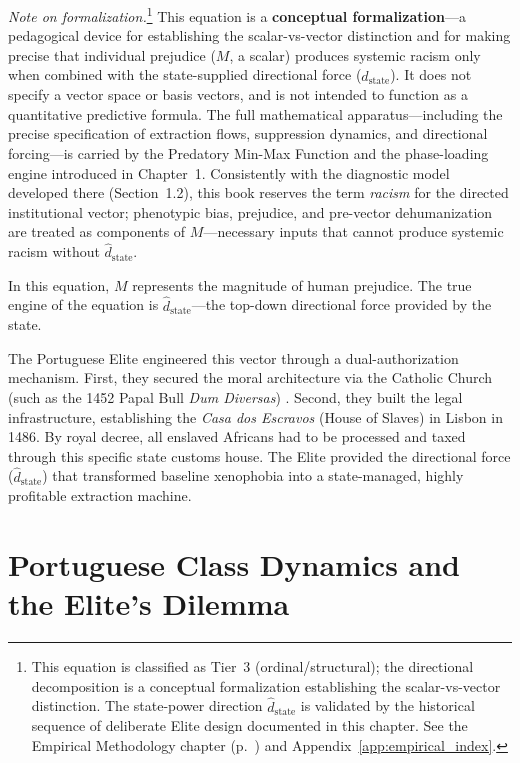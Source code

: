 \noindent\textit{Note on formalization.}\footnote{This equation is classified as Tier~3 (ordinal/structural); the directional decomposition is a conceptual formalization establishing the scalar-vs-vector distinction. The state-power direction $\hat{d}_{\text{state}}$ is validated by the historical sequence of deliberate Elite design documented in this chapter. See the Empirical Methodology chapter (p.~\pageref{ch:empirical_methodology}) and Appendix~\ref{app:empirical_index}.} This equation is a \textbf{conceptual formalization}---a pedagogical device for establishing the scalar-vs-vector distinction and for making precise that individual prejudice ($M$, a scalar) produces systemic racism only when combined with the state-supplied directional force ($\hat{d}_{\text{state}}$). It does not specify a vector space or basis vectors, and is not intended to function as a quantitative predictive formula. The full mathematical apparatus---including the precise specification of extraction flows, suppression dynamics, and directional forcing---is carried by the Predatory Min-Max Function and the phase-loading engine introduced in Chapter~1. Consistently with the diagnostic model developed there (Section~1.2), this book reserves the term \textit{racism} for the directed institutional vector; phenotypic bias, prejudice, and pre-vector dehumanization are treated as components of $M$---necessary inputs that cannot produce systemic racism without $\hat{d}_{\text{state}}$.

In this equation, $M$ represents the magnitude of human prejudice. The true engine of the equation is $\hat{d}_{\text{state}}$---the top-down directional force provided by the state.

The Portuguese Elite engineered this vector through a dual-authorization mechanism. First, they secured the moral architecture via the Catholic Church (such as the 1452 Papal Bull \textit{Dum Diversas}) \cite{dumdiversas}. Second, they built the legal infrastructure, establishing the \textit{Casa dos Escravos} (House of Slaves) in Lisbon in 1486. By royal decree, all enslaved Africans had to be processed and taxed through this specific state customs house. The Elite provided the directional force ($\hat{d}_{\text{state}}$) that transformed baseline xenophobia into a state-managed, highly profitable extraction machine.

\section{Portuguese Class Dynamics and the Elite's Dilemma}

